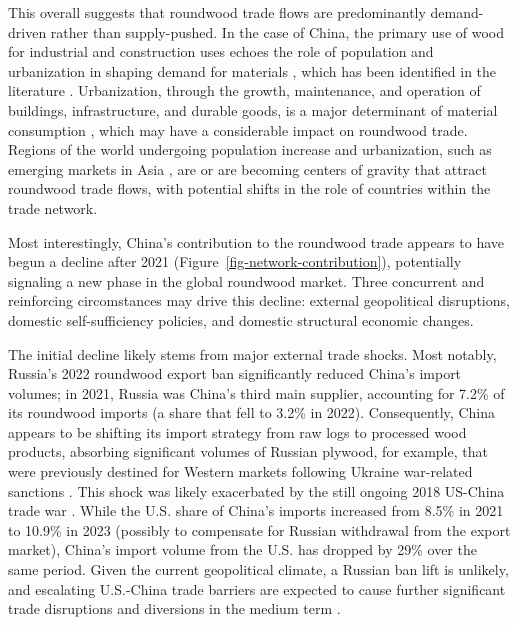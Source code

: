 \documentclass[
  authoryear,
  review,
  3p]{elsarticle}
\begin{document}
This overall suggests that roundwood trade flows are predominantly
demand-driven rather than supply-pushed. In the case of China, the
primary use of wood for industrial and construction uses
\citep{hou_intensifying_2019} echoes the role of population and
urbanization in shaping demand for materials
\citep{steinberger_global_2010}, which has been identified in the
literature
\citep{unecefao_forest_2022-1, mathieu_meta-analysis_2023, villamor_preparing_2024}.
Urbanization, through the growth, maintenance, and operation of
buildings, infrastructure, and durable goods, is a major determinant of
material consumption
\citep{fernandez_resource_2007, hu_input_2010, krausmann_global_2017, deetman_modelling_2020},
which may have a considerable impact on roundwood trade. Regions of the
world undergoing population increase and urbanization, such as emerging
markets in Asia \citep{deetman_modelling_2020, unecefao_forest_2022-1},
are or are becoming centers of gravity that attract roundwood trade
flows, with potential shifts in the role of countries within the trade
network.

Most interestingly, China's contribution to the roundwood trade appears
to have begun a decline after 2021
(Figure~\ref{fig-network-contribution}), potentially signaling a new
phase in the global roundwood market. Three concurrent and reinforcing
circomstances may drive this decline: external geopolitical disruptions,
domestic self-sufficiency policies, and domestic structural economic
changes.

The initial decline likely stems from major external trade shocks. Most
notably, Russia's 2022 roundwood export ban significantly reduced
China's import volumes; in 2021, Russia was China's third main supplier,
accounting for 7.2\% of its roundwood imports (a share that fell to
3.2\% in 2022). Consequently, China appears to be shifting its import
strategy from raw logs to processed wood products, absorbing significant
volumes of Russian plywood, for example, that were previously destined
for Western markets following Ukraine war-related sanctions
\citep{scott_against_2024}. This shock was likely exacerbated by the
still ongoing 2018 US-China trade war
\citep{muhammad_end_2021, pan_impacts_2021}. While the U.S. share of
China's imports increased from 8.5\% in 2021 to 10.9\% in 2023 (possibly
to compensate for Russian withdrawal from the export market), China's
import volume from the U.S. has dropped by 29\% over the same period.
Given the current geopolitical climate, a Russian ban lift is unlikely,
and escalating U.S.-China trade barriers are expected to cause further
significant trade disruptions and diversions in the medium term
\citep{attinasi_navigating_2024, world_bank_global_2025, world_trade_organization_global_2025}.
\end{document}
